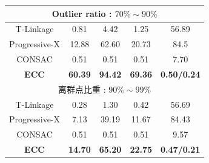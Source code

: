 \begin{table}[ht]
{\begin{tabular}{ccccc}
            \multicolumn{5}{c}{Outlier ratio : $70\%\sim90\%$} \\
            \hline
            T-Linkage & 0.81 & 4.42 & 1.25 & 56.89 \\
            Progressive-X & 12.88 & 62.60 & 20.73 & 84.5 \\
            CONSAC & 0.51 & 0.51 & 0.51 & 7.70  \\
            \textbf{ECC} & \textbf{60.39} & \textbf{94.42} & \textbf{69.36} &\textbf{0.50/0.24}\\
    
            \hline
            \multicolumn{5}{c}{离群点比重 : $90\%\sim99\%$} \\
            \hline
            T-Linkage & 0.28 & 1.30 & 0.42 & 56.69 \\
            Progressive-X & 7.13 & 39.19 & 11.67 & 84.43\\
            CONSAC & 0.51 & 0.51 & 0.51 & 9.57  \\
            \textbf{ECC} & \textbf{14.70} & \textbf{65.20} & \textbf{22.75} & \textbf{0.47/0.21} \\ %
            \bottomrule
    
        \end{tabular}
        }
        
        \label{tab:mm}
\end{table}

